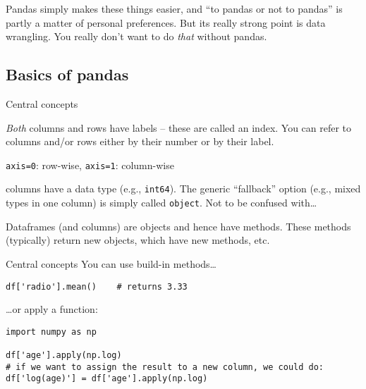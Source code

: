\begin{frame}[standout]
  Pandas simply makes these things easier, and ``to pandas or not to pandas'' is partly a matter of personal preferences. But its really strong point is data wrangling. You really don't want to do \emph{that} without pandas.

\end{frame}




\subsection{Basics of pandas}



\begin{frame}
  \begin{block}{Central concepts}
  \begin{description}[<+>]
  \item[index]\emph{Both} columns and rows have labels -- these are called an index. You can refer to columns and/or rows either by their number or by their label.
  \item[axis] \texttt{axis=0}:  row-wise, \texttt{axis=1}: column-wise
  \item[dtype]columns have a data type (e.g., \texttt{int64}). The generic ``fallback'' option (e.g., mixed types in one column) is simply called \texttt{object}. Not to be confused with\ldots
  \item[object-orientation] Dataframes (and columns) are objects and hence have methods. These methods (typically) return new objects, which have new methods, etc.
  \end{description}
\end{block}
\end{frame}


\begin{frame}[fragile]{Central concepts}
You can use build-in methods\ldots

\begin{verbatim}
df['radio'].mean()    # returns 3.33
\end{verbatim}

\ldots or apply a function:

\begin{verbatim}
import numpy as np

df['age'].apply(np.log)
# if we want to assign the result to a new column, we could do:
df['log(age)'] = df['age'].apply(np.log)
\end{verbatim}


\end{frame}


